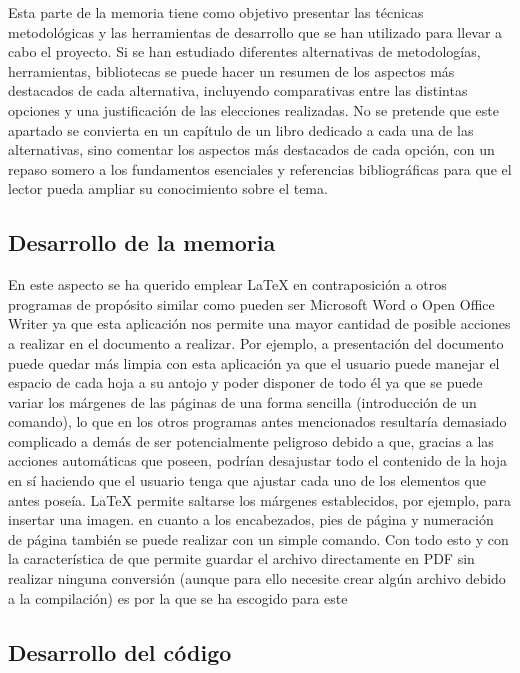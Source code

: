 
Esta parte de la memoria tiene como objetivo presentar las técnicas metodológicas y las herramientas de desarrollo que se han utilizado para llevar a cabo el proyecto. Si se han estudiado diferentes alternativas de metodologías, herramientas, bibliotecas se puede hacer un resumen de los aspectos más destacados de cada alternativa, incluyendo comparativas entre las distintas opciones y una justificación de las elecciones realizadas. 
No se pretende que este apartado se convierta en un capítulo de un libro dedicado a cada una de las alternativas, sino comentar los aspectos más destacados de cada opción, con un repaso somero a los fundamentos esenciales y referencias bibliográficas para que el lector pueda ampliar su conocimiento sobre el tema.


\subsection{Desarrollo de la memoria}

En este aspecto se ha querido emplear LaTeX en contraposición a otros programas de propósito similar como pueden ser Microsoft Word o Open Office Writer ya que esta aplicación nos permite una mayor cantidad de posible acciones a realizar en el documento a realizar. \hfill
\break\break
Por ejemplo, a presentación del documento puede quedar más limpia con esta aplicación ya que el usuario puede manejar el espacio de cada hoja a su antojo y poder disponer de todo él ya que se puede variar los márgenes de las páginas de una forma sencilla (introducción de un comando), lo que en los otros programas antes mencionados resultaría demasiado complicado a demás de ser potencialmente peligroso debido a que, gracias a las acciones automáticas que poseen, podrían desajustar todo el contenido de la hoja en sí haciendo que el usuario tenga que ajustar cada uno de los elementos que antes poseía. LaTeX permite saltarse los márgenes establecidos, por ejemplo, para insertar una imagen. en cuanto a los encabezados, pies de página y numeración de página también se puede realizar con un simple comando. \hfill
\break\break
Con todo esto y con la característica de que permite guardar el archivo directamente en PDF sin realizar ninguna conversión (aunque para ello necesite crear algún archivo debido a la compilación) es por la que se ha escogido para este 

\subsection{Desarrollo del código}

